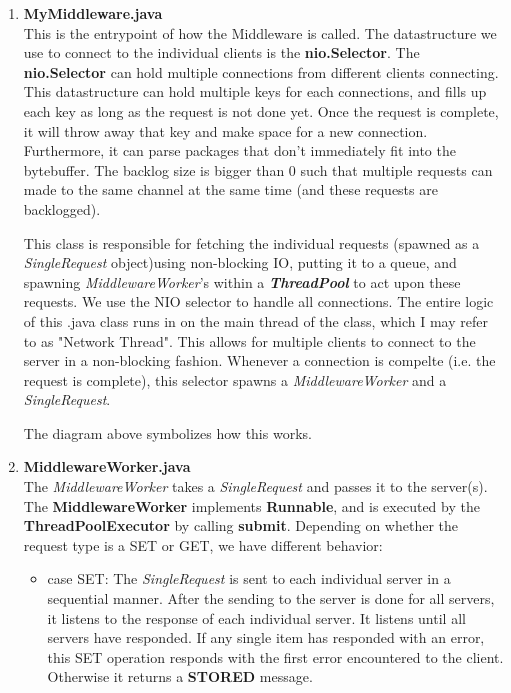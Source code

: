 \documentclass[11pt,a4paper]{article}
\begin{document}
\begin{enumerate}
\begin{enumerate}
\item \textbf{MyMiddleware.java} \\
This is the entrypoint of how the Middleware is called.
The datastructure we use to connect to the individual clients is the \textbf{nio.Selector}. 
The \textbf{nio.Selector} can hold multiple connections from different clients connecting. 
This datastructure can hold multiple keys for each connections, and fills up each key as long as the request is not done yet.
Once the request is complete, it will throw away that key and make space for a new connection.
Furthermore, it can parse packages that don't immediately fit into the bytebuffer.
The backlog size is bigger than 0 such that multiple requests can made to the same channel at the same time (and these requests are backlogged).


This class is responsible for fetching the individual requests (spawned as a \textit{SingleRequest} object)using non-blocking IO, putting it to a queue, and spawning \textit{MiddlewareWorker}'s within a \textbf{\textit{ThreadPool}} to act upon these requests.
We use the NIO selector to handle all connections.
The entire logic of this .java class runs in on the main thread of the class, which I may refer to as "Network Thread".
This allows for multiple clients to connect to the server in a non-blocking fashion.
Whenever a connection is compelte (i.e. the request is complete), this selector spawns a \textit{MiddlewareWorker} and a \textit{SingleRequest}.

The diagram above symbolizes how this works.

\item \textbf{MiddlewareWorker.java} \\
The \textit{MiddlewareWorker} takes a \textit{SingleRequest} and passes it to the server(s). 
The \textbf{MiddlewareWorker} implements \textbf{Runnable}, and is executed by the \textbf{ThreadPoolExecutor} by calling \textbf{submit}.
Depending on whether the request type is a SET or GET, we have different behavior:

\begin{itemize}
\item case SET: 
The \textit{SingleRequest} is sent to each individual server in a sequential manner.
After the sending to the server is done for all servers, it listens to the response of each individual server.
It listens until all servers have responded.
If any single item has responded with an error, this SET operation responds with the first error encountered to the client.
Otherwise it returns a \textbf{STORED} message. 


\end{itemize}
\end{enumerate}
\end{enumerate}
\end{document}
